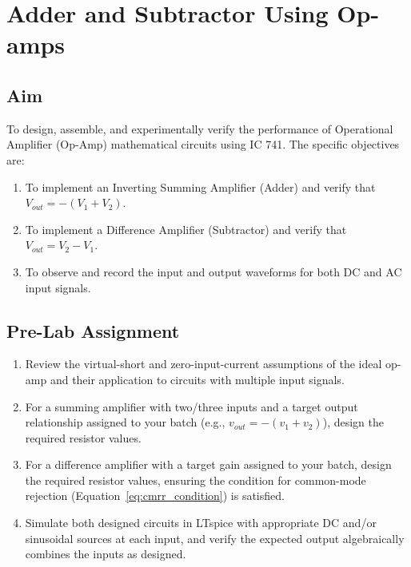%

\chapter{Adder and Subtractor Using Op-amps}

\section{Aim}
To design, assemble, and experimentally verify the performance of Operational Amplifier (Op-Amp) mathematical circuits using IC 741. The specific objectives are:
\begin{enumerate}
	\item To implement an Inverting Summing Amplifier (Adder) and verify that $V_{out} = -(V_1 + V_2)$.
	\item To implement a Difference Amplifier (Subtractor) and verify that $V_{out} = V_2 - V_1$.
	\item To observe and record the input and output waveforms for both DC and AC input signals.
\end{enumerate}

\section{Pre-Lab Assignment}
\begin{enumerate}
	\item Review the virtual-short and zero-input-current assumptions of the ideal op-amp and their application to circuits with multiple input signals.
	\item For a summing amplifier with two/three inputs and a target output relationship assigned to your batch (e.g., $v_{out} = -(v_1 + v_2)$), design the required resistor values.
	\item For a difference amplifier with a target gain assigned to your batch, design the required resistor values, ensuring the condition for common-mode rejection (Equation~\eqref{eq:cmrr_condition}) is satisfied.
	\item Simulate both designed circuits in LTspice with appropriate DC and/or sinusoidal sources at each input, and verify the expected output algebraically combines the inputs as designed.
\end{enumerate}

